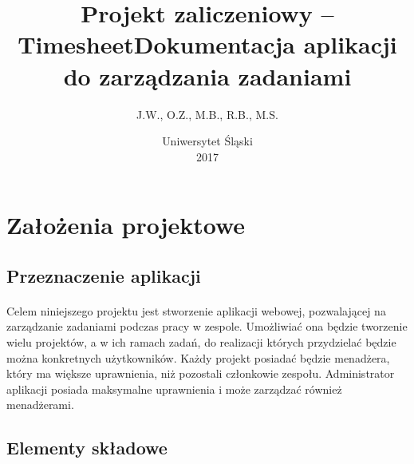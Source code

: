 \documentclass[a4paper, 12pt, oneside]{article}
\title{\textbf{Projekt zaliczeniowy -- Timesheet}\linebreak Dokumentacja aplikacji do zarządzania zadaniami}
\author{J.W., O.Z., M.B., R.B., M.S.}
\date{Uniwersytet Śląski\\2017}
\begin{document}

\maketitle
\thispagestyle{empty}

\newpage


\tableofcontents
\newpage


\section{Założenia projektowe}
	\subsection{Przeznaczenie aplikacji}
		\paragraph{}Celem niniejszego projektu jest stworzenie aplikacji webowej, pozwalającej na zarządzanie zadaniami podczas pracy w zespole. Umożliwiać ona będzie tworzenie wielu projektów, a w ich ramach zadań, do realizacji których przydzielać będzie można konkretnych użytkowników. Każdy projekt posiadać będzie menadżera, który ma większe uprawnienia, niż pozostali członkowie zespołu. Administrator aplikacji posiada maksymalne uprawnienia i może zarządzać również menadżerami.
	\subsection{Elementy składowe}
\end{document}
